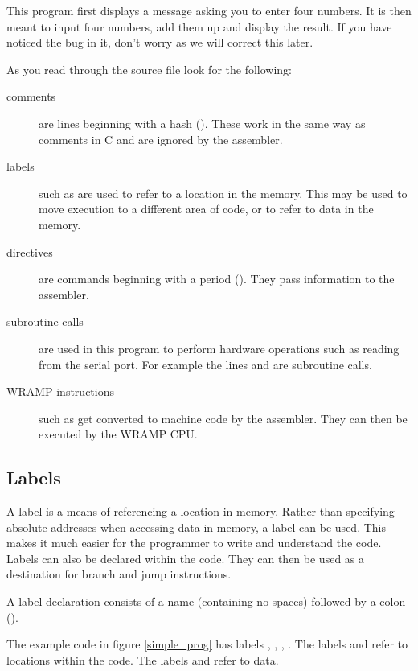 This program first displays a message asking you to enter four numbers. It
is then meant to input four numbers, add them up and display the result. 
If you have noticed the bug in it, don't worry as we will correct this later.

As you read through the source file look for the following:

\begin{description}
\item[comments] are lines beginning with a hash (\src{\#}). These work in
the same way as \src{//} comments in C and are ignored by the assembler.
%
\item[labels] such as  are used to refer to a location in the
memory. This may be used to move execution to a different area of code,
or to refer to data in the memory.
%
\item[directives] are commands beginning with a period (). They
pass information to the assembler.
%
\item[subroutine calls] are used in this program to perform hardware
operations such as reading from the serial port. For example the
lines  and  are subroutine calls.
%
\item[WRAMP instructions] such as  get
converted to machine code by the assembler. They can then be executed by the
WRAMP CPU.
%
\end{description}

\subsection{Labels}
A label is a means of referencing a location in memory.  Rather than
specifying absolute addresses when accessing data in memory, a label
can be used.  This makes it much easier for the programmer to write
and understand the code.  Labels can also be declared within the
code. They can then be used as a destination for branch and jump
instructions.

A label declaration consists of a name (containing no spaces) followed
by a colon (\src{:}).

The example code in figure \ref{simple_prog} has labels ,
, , .  The labels
 and  refer to locations within the code.  The
labels  and  refer to data.





